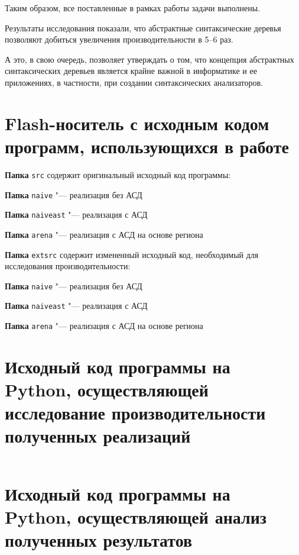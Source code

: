 \documentclass[coursework]{SCWorks}
\begin{document}
Таким образом, все поставленные в рамках работы задачи выполнены.

Результаты исследования показали, что абстрактные синтаксические деревья позволяют добиться увеличения производительности в 5–6 раз.

А это, в свою очередь, позволяет утверждать о том, что концепция абстрактных синтаксических деревьев является крайне важной в информатике и ее приложениях, в частности, при создании синтаксических анализаторов.
%






\appendix
\section{Flash-носитель с исходным кодом программ, использующихся в работе}
\label{app:А}
\noindent\textbf{Папка} \texttt{src} содержит оригинальный исходный код программы:

\textbf{Папка} \texttt{naive} "--- реализация без АСД

\textbf{Папка} \texttt{naiveast} "--- реализация с АСД

\textbf{Папка} \texttt{arena} "--- реализация с АСД на основе региона

\noindent\textbf{Папка} \texttt{extsrc} содержит измененный исходный код, необходимый для исследования производительности:

\textbf{Папка} \texttt{naive} "--- реализация без АСД

\textbf{Папка} \texttt{naiveast} "--- реализация с АСД

\textbf{Папка} \texttt{arena} "--- реализация с АСД на основе региона

\section{Исходный код программы на Python, осуществляющей исследование производительности полученных реализаций}
\label{app:Б}
\inputminted{python}{test.py}
\section{Исходный код программы на Python, осуществляющей анализ полученных результатов}
\label{app:В}
\inputminted{python}{graph.py}
\end{document}
